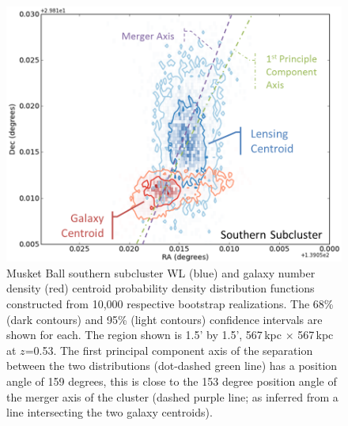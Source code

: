 \begin{figure}
\centering
\includegraphics[width=5in]{Chapter4/AnalysisFiles/southcentroids_histplot2d_reformat.png}
\caption[Musket Ball southern subcluster galaxy and weak lensing centroid spatial distribution.]{
Musket Ball southern subcluster WL (blue) and galaxy number density (red) centroid probability density distribution functions constructed from 10,000 respective bootstrap realizations.
The 68\% (dark contours) and 95\% (light contours) confidence intervals are shown for each.
The region shown is 1.5' by 1.5', 567\,kpc $\times$ 567\,kpc at $z$=0.53.
The first principal component axis of the separation between the two distributions (dot-dashed green line) has a position angle of 159 degrees, this is close to the 153 degree position angle of the merger axis of the cluster (dashed purple line; as inferred from a line intersecting the two galaxy centroids).
}
\label{figure:CentroidDist_South}
\end{figure}

